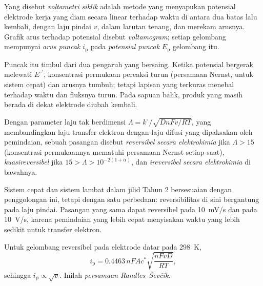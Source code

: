 \begin{definition}\label{def:b3:electrode-kinetics:cv}
Yang disebut \emph{voltametri siklik} adalah metode
yang menyapukan potensial elektrode kerja yang diam secara linear terhadap
waktu di antara dua batas lalu kembali, dengan laju pindai $v$, dalam larutan
tenang, dan merekam arusnya. Grafik arus terhadap potensial disebut
\emph{voltamogram}; setiap gelombang mempunyai \emph{arus
puncak} $i_{\mathrm p}$ pada \emph{potensial
puncak} $E_{\mathrm p}$ gelombang itu.
\end{definition}

Puncak itu timbul dari dua pengaruh yang bersaing. Ketika potensial bergerak
melewati $E^{\circ\prime}$, konsentrasi permukaan pereaksi turun (persamaan
Nernst, untuk sistem cepat) dan arusnya tumbuh; tetapi lapisan yang terkuras
menebal terhadap waktu dan fluksnya turun. Pada sapuan balik, produk yang
masih berada di dekat elektrode diubah kembali.

\begin{definition}[Reversibilitas]\label{def:b3:electrode-kinetics:reversibility}
Dengan parameter laju tak berdimensi $\Lambda = k^\circ/\sqrt{DnFv/RT}$, yang
membandingkan laju transfer elektron dengan laju difusi yang dipaksakan oleh
pemindaian, sebuah pasangan disebut \emph{reversibel secara
elektrokimia}
jika $\Lambda > 15$ (konsentrasi permukaannya mematuhi persamaan Nernst setiap
saat), \emph{kuasireversibel} jika $15 >
\Lambda > 10^{-2(1 + \alpha)}$, dan \emph{ireversibel secara
elektrokimia} di bawahnya.
\end{definition}

\begin{remark}
Sistem cepat dan sistem lambat dalam jilid Tahun 2 bersesuaian dengan
penggolongan ini, tetapi dengan satu perbedaan: reversibilitas di sini
bergantung pada laju pindai. Pasangan yang sama dapat reversibel pada
\qty{10}{mV/s} dan  pada \qty{10}{V/s}, karena pemindaian yang
lebih cepat menyisakan waktu yang lebih sedikit untuk transfer elektron.
\end{remark}

\begin{proposition}\label{prop:b3:electrode-kinetics:randles-sevcik}
Untuk gelombang reversibel pada elektrode datar pada \qty{298}{K},
\[
  i_{\mathrm p} = 0.4463\,nFAc^*\sqrt{\frac{nFvD}{RT}},
\]
sehingga $i_{\mathrm p} \propto \sqrt v$. Inilah \emph{persamaan Randles--Ševčík}.
\end{proposition}

